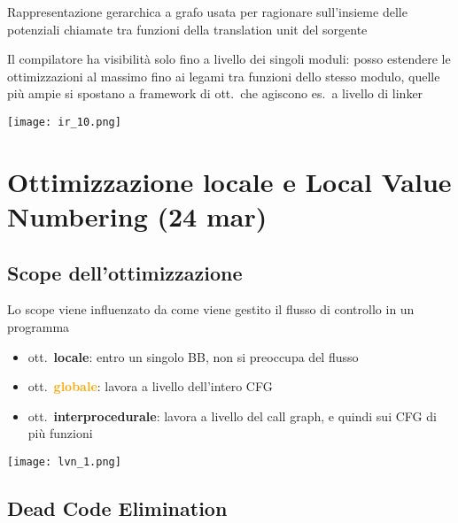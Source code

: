 \noindent\begin{minipage}[c]{.6\textwidth}
Rappresentazione gerarchica a grafo usata per ragionare sull'insieme delle potenziali chiamate tra funzioni della translation unit del sorgente

\begin{emphasize}[frametitle={Nota}]
  Il compilatore ha visibilit\`a solo fino a livello dei singoli moduli: posso estendere le ottimizzazioni al massimo fino ai legami tra funzioni dello stesso modulo, quelle pi\`u ampie si spostano a framework di ott.~che agiscono es.~a livello di linker
\end{emphasize}
\end{minipage}
\begin{minipage}[c]{.4\textwidth}
\texttt{[image: ir\_10.png]}
\end{minipage}

\section{Ottimizzazione locale e Local Value Numbering (24 mar)}

\subsection{Scope dell'ottimizzazione}

\noindent\begin{minipage}[c]{.55\textwidth}
Lo scope viene influenzato da come viene gestito il flusso di controllo in un programma

\begin{itemize}
  \item ott.~\textbf{\textcolor{Emerald}{locale}}: entro un singolo BB, non si preoccupa del flusso
  \item ott.~\textbf{\textcolor{Orange}{globale}}: lavora a livello dell'intero CFG
  \item ott.~\textbf{\textcolor{Cerulean}{interprocedurale}}: lavora a livello del call graph, e quindi sui CFG di pi\`u funzioni
\end{itemize}
\end{minipage}\hfill
\begin{minipage}[c]{.4\textwidth}
\texttt{[image: lvn\_1.png]}
\end{minipage}

\subsection{Dead Code Elimination}

